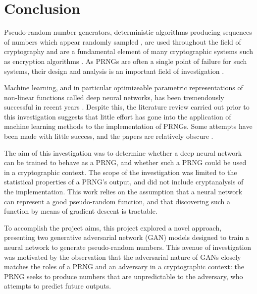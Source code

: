 \documentclass[12pt, titlepage]{report}
\theoremstyle{definition}
\begin{document}
{%
\chapter{Conclusion}\label{chapter:conclusion}
Pseudo-random number generators, deterministic algorithms producing sequences of numbers which appear randomly sampled \cite[p. 7]{barker2007recommendation}, are used throughout the field of cryptography and are a fundamental element of many cryptographic systems such as encryption algorithms  \cite[p. 169]{menezes1996handbook} \cite[p. 1]{kelsey1998cryptanalytic}. As PRNGs are often a single point of failure for such systems, their design and analysis is an important field of investigation \cite[p. 2]{kelsey1998cryptanalytic} \cite{deng2017developments}. 

Machine learning, and in particular optimizeable parametric representations of non-linear functions called deep neural networks, has been tremendously successful in recent years \cite[p. 24-29]{russel2009artificial}. Despite this, the literature review carried out prior to this investigation suggests that little effort has gone into the application of machine learning methods to the implementation of PRNGs. Some attempts have been made with little success, and the papers are relatively obscure \cite{desai2011pseudo} \cite{desai2012pseudo} \cite{tirdad2010hopfield}.

The aim of this investigation was to determine whether a deep neural network can be trained to behave as a PRNG, and whether such a PRNG could be used in a cryptographic context. The scope of the investigation was limited to the statistical properties of a PRNG's output, and did not include cryptanalysis of the implementation. This work relies on the assumption that a neural network can represent a good pseudo-random function, and that discovering such a function by means of gradient descent is tractable. 

To accomplish the project aims, this project explored a novel approach, presenting two generative adversarial network (GAN) models designed to train a neural network to generate pseudo-random numbers. This avenue of investigation was motivated by the observation that the adversarial nature of GANs closely matches the roles of a PRNG and an adversary in a cryptographic context: the PRNG seeks to produce numbers that are unpredictable to the adversary, who attempts to predict future outputs. 

}
\end{document}
